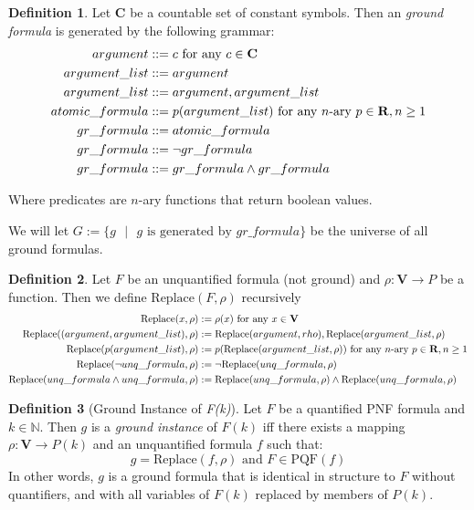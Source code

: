 \documentclass[12pt]{article}
\theoremstyle{definition}
\newtheorem{definition}{Definition}
\theoremstyle{remark}
\newcommand{\st}{\text{ }|\text{ }}
\newcommand{\PQF}{\text{PQF}}
\newcommand{\replace}{\text{Replace}}
\begin{document}
\begin{definition}
  Let $\mathbf{C}$ be a countable set of constant symbols.  Then an \textit{ground formula} is generated by the following grammar:
  \begin{align*}
    argument &::= c \hfill \text{ for any } c \in \mathbf{C}\\
    argument\_list &::= argument\\
    argument\_list &::= argument,argument\_list\\
    atomic\_formula &::= p(argument\_list) \hfill \text{ for any } n\text{-ary } p \in \mathbf{R}, n \geq 1\\
    gr\_formula &::= atomic\_formula\\
    gr\_formula &::= \neg gr\_formula\\
    gr\_formula &::= gr\_formula \land gr\_formula\\
  \end{align*}

  Where predicates are $n$-ary functions that return boolean values.

  We will let $G := \{g \st g \text{ is generated by } gr\_formula\}$ be the universe of all ground formulas.
\end{definition}

\begin{definition}
  Let $F$ be an unquantified formula (not ground) and $\rho : \mathbf{V} \to P$ be a function.  Then we define $\replace(F,\rho)$ recursively
  \begin{align*}
    \replace(x,\rho) &:= \rho(x) \hfill \text{ for any } x \in \mathbf{V}\\
    \replace((argument,argument\_list),\rho) &:= \replace(argument,rho), \replace(argument\_list,\rho)\\
    \replace(p(argument\_list),\rho) &:= p(\replace(argument\_list,\rho)) \hfill \text{ for any } n\text{-ary } p \in \mathbf{R}, n \geq 1\\
    \replace(\neg unq\_formula,\rho) &:= \neg \replace(unq\_formula,\rho)\\
    \replace(unq\_formula \land unq\_formula,\rho) &:= \replace(unq\_formula,\rho) \land \replace(unq\_formula,\rho)\\
  \end{align*}
\end{definition}

\begin{definition}[Ground Instance of \textit{F(k)}]
  Let $F$ be a quantified PNF formula and $k \in \mathbb{N}$.  Then $g$ is a \textit{ground instance} of $F(k)$ iff there exists a mapping $\rho : \mathbf{V} \to P(k)$ and an unquantified formula $f$ such that:
  $$g = \replace(f,\rho) \text{ and } F \in \PQF(f)$$
  In other words, $g$ is a ground formula that is identical in structure to $F$ without quantifiers, and with all variables of $F(k)$ replaced by members of $P(k)$.
\end{definition}
\end{document}
